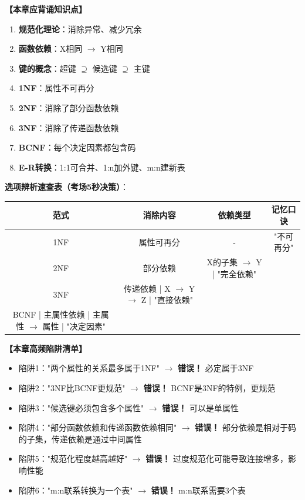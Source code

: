 \documentclass[12pt, a4paper]{article}
\newenvironment{bluebox}[1]{%
  \begin{trivlist}
  \item[\hskip\labelsep \textbf{#1}]
  \setlength{\parskip}{0.5ex}
  \setlength{\itemsep}{0.5ex}
}{%
  \end{trivlist}
  }
\begin{document}
\begin{bluebox}{命题人思维版}
	\textbf{【本章应背诵知识点】}

	\begin{enumerate}[leftmargin=*, label=\textbf{\arabic*.}]
		\item \textbf{规范化理论}：消除异常、减少冗余
		\item \textbf{函数依赖}：X相同 $\to$ Y相同
		\item \textbf{键的概念}：超键 $\supseteq$ 候选键 $\supseteq$ 主键
		\item \textbf{1NF}：属性不可再分
		\item \textbf{2NF}：消除了部分函数依赖
		\item \textbf{3NF}：消除了传递函数依赖
		\item \textbf{BCNF}：每个决定因素都包含码
		\item \textbf{E-R转换}：1:1可合并、1:n加外键、m:n建新表
	\end{enumerate}

	\textbf{选项辨析速查表（考场5秒决策）}：

	\begin{tabular}{|c|c|c|c|}
		\hline
		\textbf{范式} & \textbf{消除内容}                     & \textbf{依赖类型}         & \textbf{记忆口诀} \\
		\hline
		1NF         & 属性可再分                             & -                     & "不可再分"        \\
		\hline
		2NF         & 部分依赖                              & X的子集 $\to$ Y | "完全依赖"                 \\
		\hline
		3NF         & 传递依赖 | X $\to$ Y $\to$ Z | "直接依赖"                                         \\
		\hline
		BCNF | 主属性依赖 | 主属性 $\to$ 属性 | "决定因素"                                                    \\
		\hline
	\end{tabular}
\end{bluebox}

\begin{bluebox}{高频陷阱清单}
	\textbf{【本章高频陷阱清单】}

	\begin{itemize}
		\item 陷阱1："两个属性的关系最多属于1NF" $\rightarrow$ \textbf{错误！} 必定属于3NF
		\item 陷阱2："3NF比BCNF更规范" $\rightarrow$ \textbf{错误！} BCNF是3NF的特例，更规范
		\item 陷阱3："候选键必须包含多个属性" $\rightarrow$ \textbf{错误！} 可以是单属性
		\item 陷阱4："部分函数依赖和传递函数依赖相同" $\rightarrow$ \textbf{错误！} 部分依赖是相对于码的子集，传递依赖是通过中间属性
		\item 陷阱5："规范化程度越高越好" $\rightarrow$ \textbf{错误！} 过度规范化可能导致连接增多，影响性能
		\item 陷阱6："m:n联系转换为一个表" $\rightarrow$ \textbf{错误！} m:n联系需要3个表
	\end{itemize}
\end{bluebox}
\end{document}
